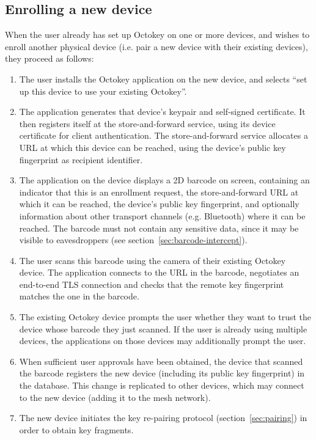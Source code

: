 \subsection{Enrolling a new device}\label{sec:newdevice}

When the user already has set up Octokey on one or more devices, and wishes to enroll another
physical device (i.e. pair a new device with their existing devices), they proceed as follows:

\begin{enumerate}
\item The user installs the Octokey application on the new device, and selects ``set up this device
to use your existing Octokey''.
\item The application generates that device's keypair and self-signed certificate. It then registers
itself at the store-and-forward service, using its device certificate for client authentication. The
store-and-forward service allocates a URL at which this device can be reached, using the device's
public key fingerprint as recipient identifier.
\item The application on the device displays a 2D barcode on screen, containing an indicator that
this is an enrollment request, the store-and-forward URL at which it can be reached, the device's
public key fingerprint, and optionally information about other transport channels (e.g. Bluetooth)
where it can be reached. The barcode must not contain any sensitive data, since it may be visible to
eavesdroppers (see section~\ref{sec:barcode-intercept}).
\item The user scans this barcode using the camera of their existing Octokey device. The application
connects to the URL in the barcode, negotiates an end-to-end TLS connection and checks that the
remote key fingerprint matches the one in the barcode.
\item The existing Octokey device prompts the user whether they want to trust the device whose
barcode they just scanned. If the user is already using multiple devices, the applications on those
devices may additionally prompt the user.
\item When sufficient user approvals have been obtained, the device that scanned the barcode
registers the new device (including its public key fingerprint) in the database. This change is
replicated to other devices, which may connect to the new device (adding it to the mesh network).
\item The new device initiates the key re-pairing protocol (section~\ref{sec:pairing}) in order to
obtain key fragments.
\end{enumerate}

